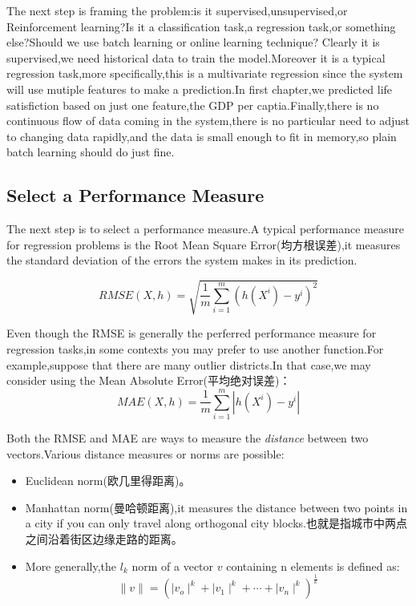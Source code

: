 \documentclass[UTF8]{ctexart}
\begin{document}
The next step is framing the problem:is it supervised,unsupervised,or Reinforcement learning?Is it a classification task,a regression task,or something else?Should we use batch learning or online learning technique?
Clearly it is supervised,we need historical data to train the model.Moreover it is a typical regression task,more specifically,this is a multivariate regression since the system will use mutiple features to make a prediction.In first chapter,we predicted life satisfiction based on just one feature,the GDP per captia.Finally,there is no continuous flow of data coming in the system,there is no particular need to adjust to changing data rapidly,and the data is small enough to fit in memory,so plain batch learning should do just fine.

\subsection{Select a Performance Measure}
The next step is to select a performance measure.A typical performance measure for regression problems is the Root Mean Square Error(均方根误差),it measures the standard deviation of the errors the system makes in its prediction.

\begin{equation}
RMSE(X,h) = \sqrt{\frac{1}{m}\sum_{i=1}^{m}(h(X^{i})-y^{i})^{2}}
\end{equation}

Even though the RMSE is generally the perferred performance measure for regression tasks,in some contexts you may prefer to use another function.For example,suppose that there are many outlier districts.In that case,we may consider using the Mean Absolute Error(平均绝对误差)：
\begin{equation}
	MAE(X,h) = \frac{1}{m}\sum_{i=1}^{m}|h(X^i)-y^i|
\end{equation}

Both the RMSE and MAE are ways to measure the \emph{distance} between two vectors.Various distance measures or norms are possible:
\begin{itemize}
	\item Euclidean norm(欧几里得距离)。
	\item Manhattan norm(曼哈顿距离),it measures the distance between two points in a city if you can only travel along orthogonal city blocks.也就是指城市中两点之间沿着街区边缘走路的距离。
	\item More generally,the $l_{k}$ norm of a vector $v$ containing n elements is defined as:
	\begin{equation}
		\parallel v \parallel = (\mid v_{o} \mid^k + \mid v_{1} \mid^k+ \cdots + \mid v_{n} \mid^k)^\frac{1}{k} 
	\end{equation}
\end{itemize}
\end{document}
